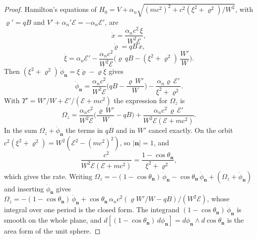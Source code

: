 \documentclass[aps,prd,onecolumn,tightenlines,nofootinbib,notitlepage,11pt,floatfix]{revtex4-2}
\theoremstyle{indentedtheorem}
\begin{document}
\begin{proof}
Hamilton's equations of $H_0=V+\alpha_n\sqrt{(mc^2)^2+c^2(\xi^2+\varrho^2)/W^2}$, with $\varrho'=qB$ and $V'+\alpha_n'\mathcal{E}=-\alpha_n\mathcal{E}'$, are
\begin{equation*}
    \dot{x} = \frac{\alpha_nc^2\,\xi}{W^2\mathcal{E}} ,
\end{equation*}
\begin{equation*}
    \dot{\varrho} = qB\,\dot{x} ,
\end{equation*}
\begin{equation*}
    \dot{\xi} = \alpha_n\mathcal{E}' - \frac{\alpha_nc^2}{W^2\mathcal{E}}\Big(\varrho\,qB-(\xi^2+\varrho^2)\,\frac{W'}{W}\Big) .
\end{equation*}
Then $(\xi^2+\varrho^2)\,\dot{\phi}_\mathbf{n}=\xi\dot{\varrho}-\varrho\dot{\xi}$ gives
\begin{equation*}
    \dot{\phi}_\mathbf{n} =\frac{\alpha_nc^2}{W^2\mathcal{E}}\Big(qB-\frac{\varrho\,W'}{W}\Big) - \frac{\alpha_n\varrho\,\mathcal{E}'}{\xi^2+\varrho^2} .
\end{equation*}
With $\Upsilon'=W'/W+\mathcal{E}'/(\mathcal{E}+mc^2)$ the expression for $\Omega_z$ is
\begin{equation*}
    \Omega_z = \frac{\alpha_nc^2}{W^2\mathcal{E}}\Big(\frac{\varrho\,W'}{W}-qB\Big) + \frac{\alpha_nc^2\,\varrho\,\mathcal{E}'}{W^2\mathcal{E}(\mathcal{E}+mc^2)} .
\end{equation*}
In the sum $\Omega_z+\dot{\phi}_\mathbf{n}$ the terms in $qB$ and in $W'$ cancel exactly. On the orbit $c^2(\xi^2+\varrho^2)=W^2(\mathcal{E}^2-(mc^2)^2)$, so $|\mathbf{n}|=1$, and
\begin{equation*}
    \frac{c^2}{W^2\mathcal{E}(\mathcal{E}+mc^2)} = \frac{1-\cos\theta_\mathbf{n}}{\xi^2+\varrho^2} ,
\end{equation*}
which gives the rate. Writing $\Omega_z=-(1-\cos\theta_\mathbf{n})\,\dot{\phi}_\mathbf{n}-\cos\theta_\mathbf{n}\,\dot{\phi}_\mathbf{n}+(\Omega_z+\dot{\phi}_\mathbf{n})$ and inserting $\dot{\phi}_\mathbf{n}$ gives $\Omega_z=-(1-\cos\theta_\mathbf{n})\,\dot{\phi}_\mathbf{n}+\cos\theta_\mathbf{n}\,\alpha_nc^2(\varrho W'/W-qB)/(W^2\mathcal{E})$, whose integral over one period is the closed form. The integrand $(1-\cos\theta_\mathbf{n})\,\dot{\phi}_\mathbf{n}$ is smooth on the whole plane, and $d[(1-\cos\theta_\mathbf{n})\,d\phi_\mathbf{n}]=d\phi_\mathbf{n}\wedge d\cos\theta_\mathbf{n}$ is the area form of the unit sphere.
\end{proof}
\end{document}
